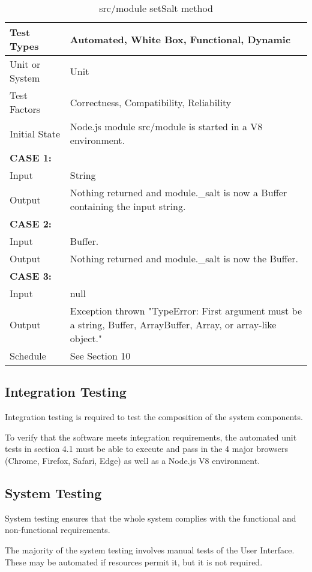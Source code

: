 \documentclass[12pt]{article}
\begin{document}
\begin{table}
\caption{src/module setSalt method}
\begin{tabular}{|p{0.2\linewidth} || p{0.8\linewidth}|}
\hline
Test Types & Automated, White Box, Functional, Dynamic \\
\hline
Unit or System & Unit \\
\hline
Test Factors & Correctness, Compatibility, Reliability\\
\hline
Initial State & Node.js module src/module is started in a V8 environment. \\
\hline
\hline
\textbf{CASE 1:} & \\
Input & String \\
\hline
Output & Nothing returned and module.\_salt is now a Buffer containing the input string. \\
\hline
\hline
\textbf{CASE 2:} & \\
Input & Buffer. \\
\hline
Output & Nothing returned and module.\_salt is now the Buffer. \\
\hline
\hline
\textbf{CASE 3:} & \\
Input & null \\
\hline
Output & Exception thrown "TypeError: First argument must be a string, Buffer, ArrayBuffer, Array, or array-like object." \\
\hline
Schedule & See Section 10 \\
\hline
\end{tabular}
\end{table} 

\subsection{Integration Testing}
Integration testing is required to test the composition of the system components.

To verify that the software meets integration requirements, the automated unit tests in section 4.1 must be able to execute and pass in the 4 major browsers (Chrome, Firefox, Safari, Edge) as well as a Node.js V8 environment.

\subsection{System Testing}
System testing ensures that the whole system complies with the functional and non-functional requirements.

The majority of the system testing involves manual tests of the User Interface. These may be automated if resources permit it, but it is not required.
\end{document}
